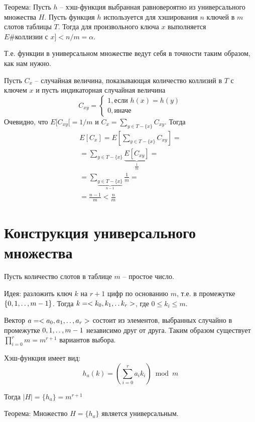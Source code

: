 \documentclass[11pt]{article}
\begin{document}
Теорема: Пусть $h$ -- хэш-функция выбранная равновероятно из универсального множества $H$. Пусть функция $h$ используется для хэширования $n$ ключей в $m$ слотов таблицы $T$. Тогда для произвольного ключа $x$ выполняется $E\#\text{коллизии с }x] < n/m = \alpha$.

Т.е. функции в универсальном множестве ведут себя в точности таким образом, как нам нужно.

Пусть $C_x$ -- случайная величина, показывающая количество коллизий в $T$ с ключем $x$ и пусть индикаторная случайная величина
\begin{equation*}
  C_{xy} = \begin{cases}
      1, \text{если } h(x) = h(y) \\
      0, \text{иначе}
  \end{cases}
\end{equation*}
Очевидно, что $E[C_{xy}[ = 1/m$ и $C_x = \sum_{y \in T-\{x\}}C_{xy}$. Тогда
\begin{align*}
  E[C_x] = E\left[\sum_{y \in T-\{x\}}C_{xy}\right] = \\
  = \sum_{y \in T-\{x\}}\underbrace{E[C_{xy}]}_{\frac{1}{m}} = \\
  = \sum_{ \underbrace{y \in T-\{x\}}_{n-1} }\frac{1}{m} = \\
  = \frac{n-1}{m} < \frac{n}{m}
\end{align*}

\section{Конструкция универсального множества}

Пусть количество слотов в таблице $m$ -- простое число.

Идея: разложить ключ $k$ на $r+1$ цифр по основанию $m$, т.е. в промежутке $\{0, 1, \mathinner{\ldotp\ldotp}, m-1\}$. Тогда $k = < k_0, k_1, \mathinner{\ldotp\ldotp} k_r >$, где $0 \leqslant k_i \leqslant m$.

Вектор $a = <a_0, a_1, \mathinner{\ldotp\ldotp}, a_r>$ состоит из элементов, выбранных случайно в промежутке ${0, 1, \mathinner{\ldotp\ldotp}, m-1}$ независимо друг от друга. Таким образом существует $\prod_{i=0}^{r} m = m^{r+1}$ вариантов выбора.

Хэш-функция имеет вид:
\begin{equation*}
  h_a(k) = \left(\sum_{i=0}^{r} a_i k_i\right) \bmod m
\end{equation*}

Тогда $|H| = \{ h_a \} = m^{r+1}$

Теорема: Множество $H = \{h_a\}$ является универсальным.
\end{document}
